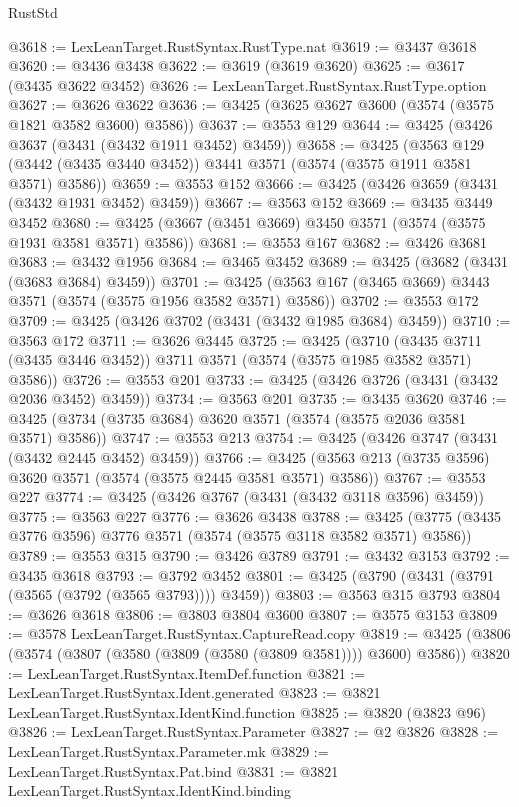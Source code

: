\begin{lexlean}{RustStd}
\begin{coremodule}
@3618 := LexLeanTarget.RustSyntax.RustType.nat
@3619 := @3437 @3618
@3620 := @3436 @3438
@3622 := @3619 (@3619 @3620)
@3625 := @3617 (@3435 @3622 @3452)
@3626 := LexLeanTarget.RustSyntax.RustType.option
@3627 := @3626 @3622
@3636 := @3425 (@3625 @3627 @3600 (@3574 (@3575 @1821 @3582 @3600) @3586))
@3637 := @3553 @129
@3644 := @3425 (@3426 @3637 (@3431 (@3432 @1911 @3452) @3459))
@3658 := @3425
    (@3563 @129 (@3442 (@3435 @3440 @3452)) @3441 @3571 (@3574 (@3575 @1911 @3581 @3571) @3586))
@3659 := @3553 @152
@3666 := @3425 (@3426 @3659 (@3431 (@3432 @1931 @3452) @3459))
@3667 := @3563 @152
@3669 := @3435 @3449 @3452
@3680 := @3425 (@3667 (@3451 @3669) @3450 @3571 (@3574 (@3575 @1931 @3581 @3571) @3586))
@3681 := @3553 @167
@3682 := @3426 @3681
@3683 := @3432 @1956
@3684 := @3465 @3452
@3689 := @3425 (@3682 (@3431 (@3683 @3684) @3459))
@3701 := @3425 (@3563 @167 (@3465 @3669) @3443 @3571 (@3574 (@3575 @1956 @3582 @3571) @3586))
@3702 := @3553 @172
@3709 := @3425 (@3426 @3702 (@3431 (@3432 @1985 @3684) @3459))
@3710 := @3563 @172
@3711 := @3626 @3445
@3725 := @3425
    (@3710 (@3435 @3711 (@3435 @3446 @3452)) @3711 @3571 (@3574 (@3575 @1985 @3582 @3571) @3586))
@3726 := @3553 @201
@3733 := @3425 (@3426 @3726 (@3431 (@3432 @2036 @3452) @3459))
@3734 := @3563 @201
@3735 := @3435 @3620
@3746 := @3425 (@3734 (@3735 @3684) @3620 @3571 (@3574 (@3575 @2036 @3581 @3571) @3586))
@3747 := @3553 @213
@3754 := @3425 (@3426 @3747 (@3431 (@3432 @2445 @3452) @3459))
@3766 := @3425 (@3563 @213 (@3735 @3596) @3620 @3571 (@3574 (@3575 @2445 @3581 @3571) @3586))
@3767 := @3553 @227
@3774 := @3425 (@3426 @3767 (@3431 (@3432 @3118 @3596) @3459))
@3775 := @3563 @227
@3776 := @3626 @3438
@3788 := @3425 (@3775 (@3435 @3776 @3596) @3776 @3571 (@3574 (@3575 @3118 @3582 @3571) @3586))
@3789 := @3553 @315
@3790 := @3426 @3789
@3791 := @3432 @3153
@3792 := @3435 @3618
@3793 := @3792 @3452
@3801 := @3425 (@3790 (@3431 (@3791 (@3565 (@3792 (@3565 @3793)))) @3459))
@3803 := @3563 @315 @3793
@3804 := @3626 @3618
@3806 := @3803 @3804 @3600
@3807 := @3575 @3153
@3809 := @3578 LexLeanTarget.RustSyntax.CaptureRead.copy
@3819 := @3425 (@3806 (@3574 (@3807 (@3580 (@3809 (@3580 (@3809 @3581)))) @3600) @3586))
@3820 := LexLeanTarget.RustSyntax.ItemDef.function
@3821 := LexLeanTarget.RustSyntax.Ident.generated
@3823 := @3821 LexLeanTarget.RustSyntax.IdentKind.function
@3825 := @3820 (@3823 @96)
@3826 := LexLeanTarget.RustSyntax.Parameter
@3827 := @2 @3826
@3828 := LexLeanTarget.RustSyntax.Parameter.mk
@3829 := LexLeanTarget.RustSyntax.Pat.bind
@3831 := @3821 LexLeanTarget.RustSyntax.IdentKind.binding

\end{coremodule}
\end{lexlean}
